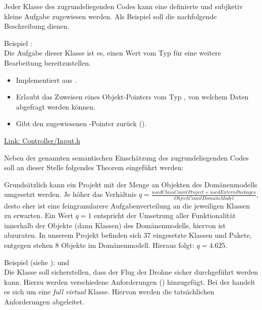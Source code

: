
Jeder Klasse des zugrundeliegenden Codes kann eine definierte und subjketiv kleine Aufgabe zugewiesen werden. Als Beispiel soll die nachfolgende Beschreibung dienen.

Beispiel :\\
Die Aufgabe dieser Klasse ist es, einen Wert vom Typ  für eine weitere Bearbeitung bereitzustellen.\\
\begin{itemize}
\item Implementiert  aus .
\item Erlaubt das Zuweisen eines Objekt-Pointers vom Typ , von welchem Daten abgefragt werden können.
\item Gibt den zugewiesenen -Pointer zurück ().
\end{itemize}


\href{https://github.com/MobMonRob/ROSLabDrohne/blob/979c6057922852eac0af20a52e29393d41adfee5/Code/Controller/include/Controller/Input.h}{Link: Controller/Input.h}


Neben der genannten semantischen Einschätzung des zugrundeliegenden Codes soll an dieser Stelle folgendes Theorem eingeführt werden:

Grundsätzlich kann ein Projekt mit der Menge an Objekten des Domänenmodells umgesetzt werden. Je höher das Verhältnis $q =\frac{used ClassCount Project + used Extern Packages}{ObjectCount Domain Model}$, desto eher ist eine feingranularere Aufgabenverteilung an die jeweiligen Klassen zu erwarten. Ein Wert $q=1$ entspricht der Umsetzung aller Funktionalität innerhalb der Objekte (dann Klassen) des Domänenmodells, hiervon ist abzuraten.
In unserem Projekt befinden sich 37 eingesetzte Klassen und Pakete, entgegen stehen 8 Objekte im Domänenmodell. Hieraus folgt: $q = 4.625$.



Beispiel (siehe ):  und \\
Die Klasse  soll sicherstellen, dass der Flug der Drohne sicher durchgeführt werden kann. Hierzu werden verschiedene Anforderungen () hinzugefügt. Bei der  handelt es sich um eine \textit{full virtual} Klasse. Hiervon werden die tatsächlichen Anforderungen abgeleitet.

